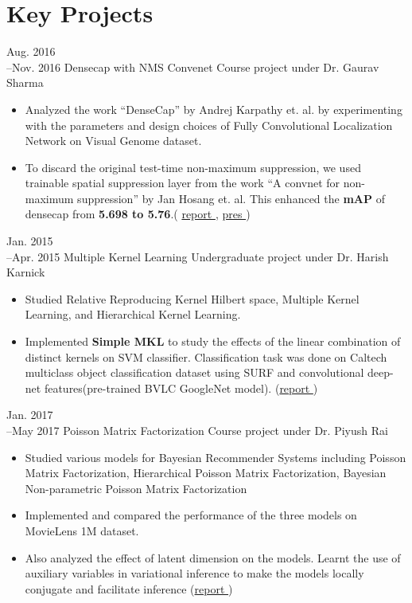 \section{Key Projects}

\cventry
{Aug. 2016\\--Nov. 2016}
{Densecap with NMS Convenet}
{Course project under Dr. Gaurav Sharma}
{}
{}
{
	\begin{itemize}
		\item {Analyzed the work ``DenseCap'' by Andrej Karpathy et. al. by experimenting with the parameters and design choices of Fully Convolutional Localization Network on Visual Genome dataset.}
		\item To discard the original test-time non-maximum suppression, we used trainable spatial suppression layer from the work ``A convnet for non-maximum suppression'' by Jan Hosang et. al. This enhanced the \textbf{mAP} of densecap from \textbf{5.698 to 5.76}.\hfill( \href{https://www.dropbox.com/s/5jidhqmthy9ks06/cs698-final-report-extended.pdf?dl=0}{report \ExternalLink}, \href{https://www.dropbox.com/s/byn2z4o4yiwf00b/CS698\%20Final\%20PPT.pdf?dl=0}{pres \ExternalLink}
		)
	\end{itemize}
}

\cventry
	{Jan. 2015\\--Apr. 2015}
	{Multiple Kernel Learning}
	{Undergraduate project under Dr. Harish Karnick}
	{}{}
	{
		\begin{itemize}
			 \item {Studied Relative Reproducing Kernel Hilbert space, Multiple Kernel Learning, and Hierarchical Kernel Learning.}
			 \item {Implemented \textbf{Simple MKL} to study the effects of the linear combination of distinct kernels on SVM classifier. Classification task was done on Caltech multiclass object classification dataset using SURF and convolutional deep-net features(pre-trained BVLC GoogleNet model). \hfill (\href{https://www.dropbox.com/s/dg987vl0zdfh6kj/cs396-graduate-project.pdf?dl=0}{report \ExternalLink})	}
		\end{itemize}
	}
	
\cventry
	{Jan. 2017\\--May 2017}
	{Poisson Matrix Factorization}
	{Course project under Dr. Piyush Rai}
	{}{}
	{
		\begin{itemize}
			\item {Studied various models for Bayesian Recommender Systems including Poisson Matrix Factorization, Hierarchical Poisson Matrix Factorization, Bayesian Non-parametric Poisson Matrix Factorization}
			\item {Implemented and compared the performance of the three models on MovieLens 1M dataset. }
			\item {Also analyzed the effect of latent dimension on the models. Learnt the use of auxiliary variables in variational inference to make the models locally conjugate and facilitate inference \hfill (\href{https://www.dropbox.com/s/a5gn52k0ggf8m5w/poisson-matrix-factorization.pdf?dl=0}{report \ExternalLink})}
		\end{itemize}
	}

